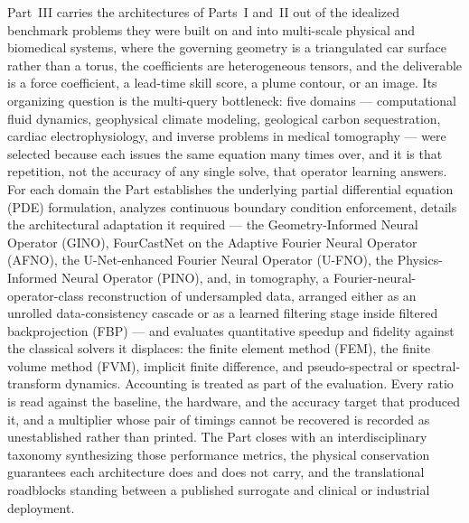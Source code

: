 \noindent Part~III carries the architectures of Parts~I and~II out of the idealized
benchmark problems they were built on and into multi-scale physical and biomedical
systems, where the governing geometry is a triangulated car surface rather than a
torus, the coefficients are heterogeneous tensors, and the deliverable is a force
coefficient, a lead-time skill score, a plume contour, or an image. Its organizing
question is the multi-query bottleneck: five domains --- computational fluid
dynamics, geophysical climate modeling, geological carbon sequestration, cardiac
electrophysiology, and inverse problems in medical tomography --- were selected
because each issues the same equation many times over, and it is that repetition,
not the accuracy of any single solve, that operator learning answers. For each
domain the Part establishes the underlying partial differential equation (PDE)
formulation, analyzes continuous boundary condition enforcement, details the
architectural adaptation it required --- the Geometry-Informed Neural Operator
(GINO), FourCastNet on the Adaptive Fourier Neural Operator (AFNO), the
U-Net-enhanced Fourier Neural Operator (U-FNO), the Physics-Informed Neural
Operator (PINO), and, in tomography, a Fourier-neural-operator-class
reconstruction of undersampled data, arranged either as an unrolled
data-consistency cascade or as a learned filtering stage inside filtered
backprojection (FBP) --- and
evaluates quantitative speedup and fidelity against the classical solvers it
displaces: the finite element method (FEM), the finite volume method (FVM),
implicit finite difference, and pseudo-spectral or spectral-transform dynamics.
Accounting is treated as part of the evaluation. Every ratio is read against the
baseline, the hardware, and the accuracy target that produced it, and a multiplier
whose pair of timings cannot be recovered is recorded as unestablished rather than
printed. The Part closes with an interdisciplinary taxonomy synthesizing those
performance metrics, the physical conservation guarantees each architecture does
and does not carry, and the translational roadblocks standing between a published
surrogate and clinical or industrial deployment.
